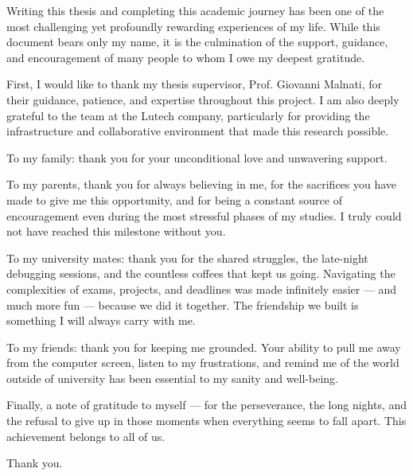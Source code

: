 Writing this thesis and completing this academic journey has been one of the most challenging yet profoundly rewarding experiences of my life. While this document bears only my name, it is the culmination of the support, guidance, and encouragement of many people to whom I owe my deepest gratitude.

\vspace{1em}
First, I would like to thank my thesis supervisor, Prof. Giovanni Malnati, for their guidance, patience, and expertise throughout this project. I am also deeply grateful to the team at the Lutech company, particularly for providing the infrastructure and collaborative environment that made this research possible.

\vspace{1em}
To my family: thank you for your unconditional love and unwavering support. 

\vspace{1em}
To my parents, thank you for always believing in me, for the sacrifices you have made to give me this opportunity, and for being a constant source of encouragement even during the most stressful phases of my studies. I truly could not have reached this milestone without you.

\vspace{1em}
To my university mates: thank you for the shared struggles, the late-night debugging sessions, and the countless coffees that kept us going. Navigating the complexities of exams, projects, and deadlines was made infinitely easier --- and much more fun --- because we did it together. The friendship we built is something I will always carry with me.

\vspace{1em}
To my friends: thank you for keeping me grounded. Your ability to pull me away from the computer screen, listen to my frustrations, and remind me of the world outside of university has been essential to my sanity and well-being.

\vspace{1em}
Finally, a note of gratitude to myself --- for the perseverance, the long nights, and the refusal to give up in those moments when everything seems to fall apart. This achievement belongs to all of us.

\vspace{1em}
Thank you.

\clearpage

